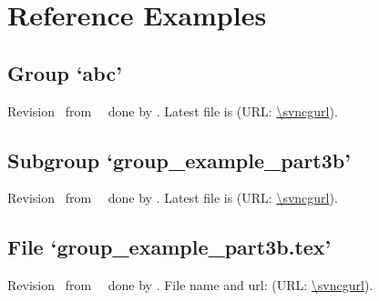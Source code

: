 \documentclass[a4paper,oneside]{scrbook}
\begin{document}
\chapter*{Reference Examples}
\section*{Group `abc'}
 Revision \svncgrev\ from \svncgtoday\ \svncgtime\ done by
\svnFullAuthor{\svncgauthor}. Latest file is \svnnolinkurl{\svncgfname} (URL: \url{\svncgurl}).

\section*{Subgroup `group\_example\_part3b'}
 Revision \svncgrev\ from \svncgtoday\ \svncgtime\ done by
\svnFullAuthor{\svncgauthor}. Latest file is \svnnolinkurl{\svncgfname} (URL: \url{\svncgurl}).

\section*{File `group\_example\_part3b.tex'}
 Revision \svncgrev\ from \svncgtoday\ \svncgtime\ done by
\svnFullAuthor{\svncgauthor}. File name and url: \svnnolinkurl{\svncgfname} (URL: \url{\svncgurl}).
\end{document}
